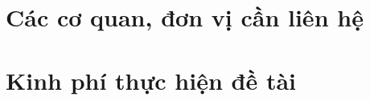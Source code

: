 \documentclass[12pt,twoside,a4paper]{article}
\begin{document}
\section{Các cơ quan, đơn vị cần liên hệ}
\section{Kinh phí thực hiện đề tài}

\pagebreak

\end{document}
